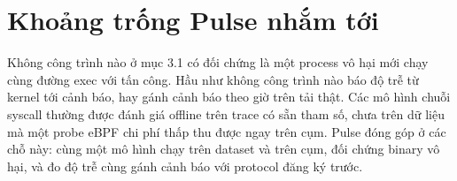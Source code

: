\section{Khoảng trống Pulse nhắm tới}

Không công trình nào ở mục 3.1 có đối chứng là một process vô hại mới chạy cùng đường exec với tấn công. Hầu như không công trình nào báo độ trễ từ kernel tới cảnh báo, hay gánh cảnh báo theo giờ trên tải thật. Các mô hình chuỗi syscall thường được đánh giá offline trên trace có sẵn tham số, chưa trên dữ liệu mà một probe eBPF chi phí thấp thu được ngay trên cụm. Pulse đóng góp ở các chỗ này: cùng một mô hình chạy trên dataset và trên cụm, đối chứng binary vô hại, và đo độ trễ cùng gánh cảnh báo với protocol đăng ký trước.
